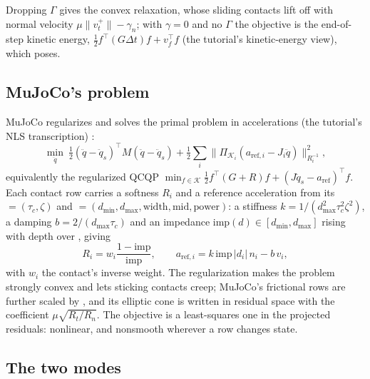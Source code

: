 Dropping $\Gamma$ gives the convex relaxation, whose sliding contacts lift off with normal velocity $\mu\lVert v^+_t\rVert - \gamma_n$; with $\gamma = 0$ and no $\Gamma$ the objective is the end-of-step kinetic energy, $\tfrac12 f^\top(G\Delta t) f + v_f^\top f$ (the tutorial's kinetic-energy view), which  poses.

\subsection{MuJoCo's problem}\label{sec:mj}

MuJoCo regularizes and solves the primal problem in accelerations (the tutorial's NLS transcription) \cite{todorov2014}:
\begin{equation}\label{eq:nls}
\min_{\ddot q}\ \tfrac12 (\ddot q - \ddot q_s)^\top M (\ddot q - \ddot q_s) + \tfrac12 \sum_i \lVert \Pi_{\mathcal K_i}(a_{\text{ref},i} - J_i \ddot q)\rVert^2_{R_i^{-1}},
\end{equation}
equivalently the regularized QCQP $\min_{f\in\mathcal K} \tfrac12 f^\top (G + R) f + (J\ddot q_s - a_{\text{ref}})^\top f$. Each contact row carries a softness $R_i$ and a reference acceleration from its  $= (\tau_c, \zeta)$ and  $= (d_{\min}, d_{\max}, \text{width}, \text{mid}, \text{power})$: a stiffness $k = 1/(d_{\max}^2 \tau_c^2 \zeta^2)$, a damping $b = 2/(d_{\max}\tau_c)$ and an impedance $\text{imp}(d) \in [d_{\min}, d_{\max}]$ rising with depth over , giving
\begin{equation}\label{eq:mjrow}
R_i = w_i \frac{1 - \text{imp}}{\text{imp}}, \qquad a_{\text{ref},i} = k\, \text{imp}\, \lvert d_i\rvert\, n_i - b\, v_i ,
\end{equation}
with $w_i$ the contact's inverse weight. The regularization makes the problem strongly convex and lets sticking contacts creep; MuJoCo's frictional rows are further scaled by , and its elliptic cone is written in residual space with the coefficient $\mu\sqrt{R_t/R_n}$. The objective is a least-squares one in the projected residuals: nonlinear, and nonsmooth wherever a row changes state.

\subsection{The two modes}\label{sec:objectives}

